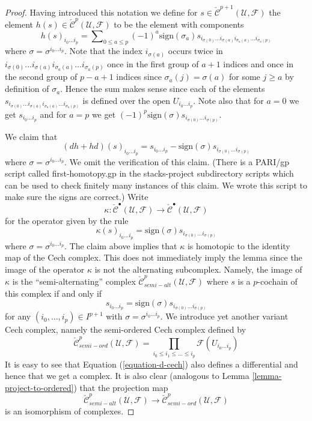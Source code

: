 \begin{proof}
\medskip\noindent
Having introduced this notation we define for
$s \in \check{\mathcal{C}}^{p + 1}(\mathcal{U}, \mathcal{F})$
the element $h(s) \in \check{\mathcal{C}}^p(\mathcal{U}, \mathcal{F})$
to be the element with components
\begin{equation}
\label{equation-first-homotopy}
h(s)_{i_0\ldots i_p} =
\sum\nolimits_{0 \leq a \leq p}
(-1)^a \text{sign}(\sigma_a)
s_{i_{\sigma(0)} \ldots i_{\sigma(a)} i_{\sigma_a(a)} \ldots i_{\sigma_a(p)}}
\end{equation}
where $\sigma = \sigma^{i_0 \ldots i_p}$. Note that the index
$i_{\sigma(a)}$ occurs twice in 
$i_{\sigma(0)} \ldots i_{\sigma(a)} i_{\sigma_a(a)} \ldots i_{\sigma_a(p)}$
once in the first group of $a + 1$ indices and once in the second group
of $p - a + 1$ indices since $\sigma_a(j) = \sigma(a)$ for some
$j \geq a$ by definition of $\sigma_a$. Hence the sum makes sense since each
of the elements
$s_{i_{\sigma(0)} \ldots i_{\sigma(a)} i_{\sigma_a(a)} \ldots i_{\sigma_a(p)}}$
is defined over the open $U_{i_0 \ldots i_p}$.
Note also that for $a = 0$ we get $s_{i_0 \ldots i_p}$ and
for $a = p$ we get
$(-1)^p \text{sign}(\sigma) s_{i_{\sigma(0)} \ldots i_{\sigma(p)}}$.

\medskip\noindent
We claim that
$$
(dh + hd)(s)_{i_0 \ldots i_p} =
s_{i_0 \ldots i_p} -
\text{sign}(\sigma) s_{i_{\sigma(0)} \ldots i_{\sigma(p)}}
$$
where $\sigma = \sigma^{i_0 \ldots i_p}$. We omit the verification
of this claim. (There is a PARI/gp script called first-homotopy.gp
in the stacks-project subdirectory scripts which can be used to check
finitely many instances of this claim.
We wrote this script to make sure the signs are correct.)
Write
$$
\kappa :
\check{\mathcal{C}}^\bullet(\mathcal{U}, \mathcal{F})
\longrightarrow
\check{\mathcal{C}}^\bullet(\mathcal{U}, \mathcal{F})
$$
for the operator given by the rule
$$
\kappa(s)_{i_0 \ldots i_p} =
\text{sign}(\sigma) s_{i_{\sigma(0)} \ldots i_{\sigma(p)}}
$$
where $\sigma = \sigma^{i_0 \ldots i_p}$. The claim above implies
that $\kappa$ is homotopic to the identity map of the Cech complex.
This does not immediately imply the lemma since
the image of the operator $\kappa$ is not the alternating subcomplex.
Namely, the image of $\kappa$ is the ``semi-alternating'' complex
$\check{\mathcal{C}}_{semi-alt}^p(\mathcal{U}, \mathcal{F})$
where $s$ is a $p$-cochain of this complex if and only if
$$
s_{i_0 \ldots i_p} = \text{sign}(\sigma) s_{i_{\sigma(0)} \ldots i_{\sigma(p)}}
$$
for any $(i_0, \ldots, i_p) \in I^{p + 1}$ with
$\sigma = \sigma^{i_0 \ldots i_p}$.
We introduce yet another variant Cech complex, namely the semi-ordered
Cech complex defined by
$$
\check{\mathcal{C}}_{semi-ord}^p(\mathcal{U}, \mathcal{F})
=
\prod_{i_0 \leq i_1 \leq \ldots \leq i_p}
\mathcal{F}(U_{i_0 \ldots i_p})
$$
It is easy to see that Equation (\ref{equation-d-cech}) also defines
a differential and hence that we get a complex. It is also clear
(analogous to Lemma \ref{lemma-project-to-ordered}) that the projection map
$$
\check{\mathcal{C}}_{semi-alt}^p(\mathcal{U}, \mathcal{F})
\longrightarrow
\check{\mathcal{C}}_{semi-ord}^p(\mathcal{U}, \mathcal{F})
$$
is an isomorphism of complexes.


\end{proof}

